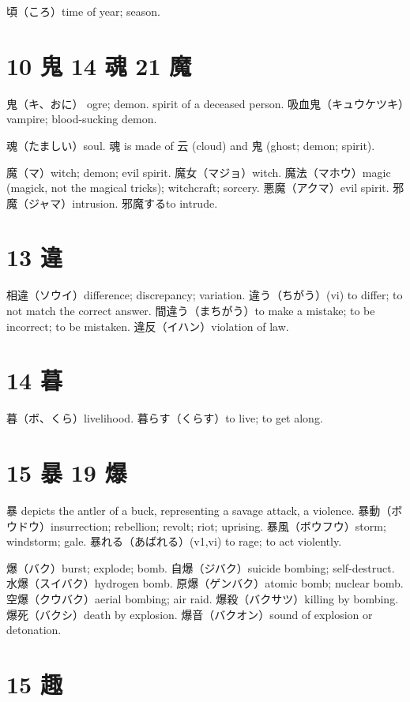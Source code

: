 頃（ころ）time of year; season.

\section{10 鬼 14 魂 21 魔}

鬼（キ、おに）
ogre; demon.
spirit of a deceased person.
吸血鬼（キュウケツキ）vampire; blood-sucking demon.

魂（たましい）soul.
魂 is made of 云 (cloud) and 鬼 (ghost; demon; spirit).

魔（マ）witch; demon; evil spirit.
魔女（マジョ）witch.
魔法（マホウ）magic (magick, not the magical tricks); witchcraft; sorcery.
悪魔（アクマ）evil spirit.
邪魔（ジャマ）intrusion.
邪魔するto intrude.

\section{13 違}

相違（ソウイ）difference; discrepancy; variation.
違う（ちがう）(vi) to differ; to not match the correct answer.
間違う（まちがう）to make a mistake; to be incorrect; to be mistaken.
違反（イハン）violation of law.

\section{14 暮}

暮（ボ、くら）livelihood.
暮らす（くらす）to live; to get along.

\section{15 暴 19 爆}

暴 depicts the antler of a buck, representing a savage attack, a violence.
暴動（ボウドウ）insurrection; rebellion; revolt; riot; uprising.
暴風（ボウフウ）storm; windstorm; gale.
暴れる（あばれる）(v1,vi) to rage; to act violently.

爆（バク）burst; explode; bomb.
自爆（ジバク）suicide bombing; self-destruct.
水爆（スイバク）hydrogen bomb.
原爆（ゲンバク）atomic bomb; nuclear bomb.
空爆（クウバク）aerial bombing; air raid.
爆殺（バクサツ）killing by bombing.
爆死（バクシ）death by explosion.
爆音（バクオン）sound of explosion or detonation.

\section{15 趣}

